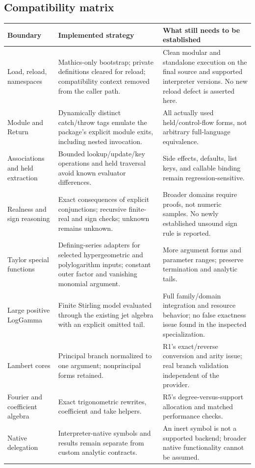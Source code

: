 \documentclass[11pt,a4paper]{article}
\begin{document}
\subsection{Compatibility matrix}
\begin{longtable}{@{}L{0.21\textwidth}L{0.34\textwidth}L{0.355\textwidth}@{}}
\toprule
Boundary & Implemented strategy & What still needs to be established\\
\midrule
\endhead
Load, reload, namespaces & Mathics-only bootstrap; private definitions cleared for reload; compatibility context removed from the caller path. & Clean modular and standalone execution on the final source and supported interpreter versions. No new reload defect is asserted here.\\
Module and Return & Dynamically distinct catch/throw tags emulate the package's explicit module exits, including nested invocation. & All actually used held/control-flow forms, not arbitrary full-language equivalence.\\
Associations and held extraction & Bounded lookup/update/key operations and held traversal avoid known evaluator differences. & Side effects, defaults, list keys, and callable binding remain regression-sensitive.\\
Realness and sign reasoning & Exact consequences of explicit conjunctions; recursive finite-real and sign checks; unknown remains unknown. & Broader domains require proofs, not numeric samples. No newly established unsound sign rule is reported.\\
Taylor special functions & Defining-series adapters for selected hypergeometric and polylogarithm inputs; constant outer factor and vanishing monomial argument. & More argument forms and parameter ranges; preserve termination and analytic tails.\\
Large positive LogGamma & Finite Stirling model evaluated through the existing jet algebra with an explicit omitted tail. & Full family/domain integration and resource behavior; no false exactness issue found in the inspected specialization.\\
Lambert cores & Principal branch normalized to one argument; nonprincipal forms retained. & R1's exact/reverse conversion and arity issue; real branch validation independent of the provider.\\
Fourier and coefficient algebra & Exact trigonometric rewrites, coefficient and take helpers. & R5's degree-versus-support allocation and matched performance checks.\\
Native delegation & Interpreter-native symbols and results remain separate from custom analytic contracts. & An inert symbol is not a supported backend; broader native functionality cannot be assumed.\\

\end{longtable}
\end{document}
